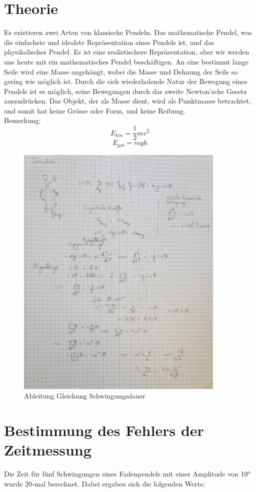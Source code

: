 \documentclass[12pt, a4paper, twoside]{article}
\begin{document}
    \section{Theorie}
    Es existieren zwei Arten von klassische Pendeln. Das mathematische Pendel, was die einfachste und idealste Repräsentation eines Pendels ist, und das physikalisches Pendel. Es ist eine realistischere  Repräsentation, aber wir werden uns heute mit ein mathematisches Pendel beschäftigen. An eine bestimmt lange Seile wird eine Masse angehängt, wobei die Masse und Dehnung der Seile so gering wie möglich ist. 
    Durch die sich wiederholende Natur der Bewegung eines Pendels ist es möglich, seine Bewegungen durch das zweite Newton’sche Gesetz auszudrücken. 
    Das Objekt, der als Masse dient, wird als Punktmasse betrachtet, und somit hat keine Grösse oder Form, und keine Reibung.\\
    Bemerkung:\\
    \[E_{kin}=\frac{1}{2}mv^{2}\] 
    \[E_{pot}=mgh\]
    \begin{figure}[h!]
        \begin{center}
            \includegraphics[scale=0.25, width=10cm]{Theorie.jpeg}
            \caption{Ableitung Gleichung Schwingungsdauer}
        \end{center}
    \end{figure}
    \pagebreak
    \section{Bestimmung des Fehlers der Zeitmessung}
    Die Zeit für fünf Schwingungen eines Fadenpendels mit einer Amplitude von 10° wurde 20-mal berechnet. Dabei ergaben sich die folgenden Werte:
    \\
    
\end{document}
